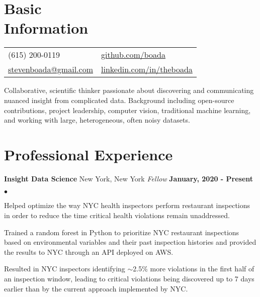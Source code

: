 \documentclass[margin,line, 11pt]{res}
\newenvironment{list2}{
  \begin{list}{$\bullet$}{%
      \setlength{\itemsep}{0in}
      \setlength{\parsep}{0in} \setlength{\parskip}{0in}
      \setlength{\topsep}{0in} \setlength{\partopsep}{0in}
      \setlength{\leftmargin}{0.2in}}}{\end{list}}
\begin{document}

\begin{resume}
\vspace*{-2mm}
\section{Basic\\Information}
\begin{tabular}{@{}p{4.9in}p{4in}}
  (615) 200-0119 & \href{https://github.com/boada}{github.com/boada} \\
  \href{mailto:stevenboada@gmail.com}{stevenboada@gmail.com} & \href{https://linkedin.com/in/theboada}{linkedin.com/in/theboada} \\
\end{tabular}

\vspace{-3mm}
Collaborative, scientific thinker passionate about discovering and communicating nuanced insight from complicated data. Background including open-source contributions, project leadership, computer vision, traditional machine learning, and working with large, heterogeneous, often noisy datasets.
\vspace*{-2mm}

\section{Professional \newline Experience}
\textbf{Insight Data Science} \hfill New York, New York\newline
\textit{Fellow} \hfill \textbf{January, 2020 - Present}\newline
    \begin{list2}
    	\vspace*{-5mm}
      \item Helped optimize the way NYC health inspectors perform restaurant inspections in order to reduce the time critical health violations remain unaddressed.
    	\item Trained a random forest in Python to prioritize NYC restaurant inspections based on environmental variables and their past inspection histories and provided the results to NYC through an API deployed on AWS.
    	\item Resulted in NYC inspectors identifying $\sim$2.5\% more violations in the first half of an inspection window,  leading to critical violations being discovered up to 7 days earlier than by the current approach implemented by NYC.
    \end{list2}
\vspace*{-2mm}


\end{resume}
\end{document}
